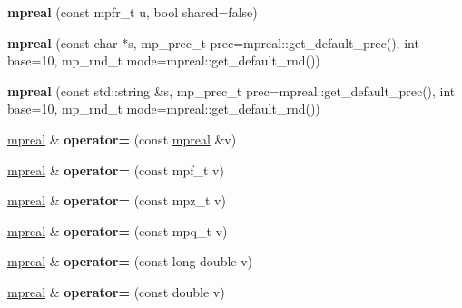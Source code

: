 \begin{DoxyCompactItemize}
{\bfseries mpreal} (const mpfr\+\_\+t u, bool shared=false)
\item 
\mbox{\label{classmpfr_1_1mpreal_ad296a1c6af9b15eda9c177a22b38af09}} 
{\bfseries mpreal} (const char $\ast$s, mp\+\_\+prec\+\_\+t prec=mpreal\+::get\+\_\+default\+\_\+prec(), int base=10, mp\+\_\+rnd\+\_\+t mode=mpreal\+::get\+\_\+default\+\_\+rnd())
\item 
\mbox{\label{classmpfr_1_1mpreal_aec2c38d5275fac999ef1dbbecbd4cf4b}} 
{\bfseries mpreal} (const std\+::string \&s, mp\+\_\+prec\+\_\+t prec=mpreal\+::get\+\_\+default\+\_\+prec(), int base=10, mp\+\_\+rnd\+\_\+t mode=mpreal\+::get\+\_\+default\+\_\+rnd())
\item 
\mbox{\label{classmpfr_1_1mpreal_a8b6d96aeb259866a554c57c95216bf3a}} 
\hyperlink{classmpfr_1_1mpreal}{mpreal} \& {\bfseries operator=} (const \hyperlink{classmpfr_1_1mpreal}{mpreal} \&v)
\item 
\mbox{\label{classmpfr_1_1mpreal_a7f00e349d3040ea4355dfe04e22623af}} 
\hyperlink{classmpfr_1_1mpreal}{mpreal} \& {\bfseries operator=} (const mpf\+\_\+t v)
\item 
\mbox{\label{classmpfr_1_1mpreal_a22c479baa5a340e77fe26f13d1807c62}} 
\hyperlink{classmpfr_1_1mpreal}{mpreal} \& {\bfseries operator=} (const mpz\+\_\+t v)
\item 
\mbox{\label{classmpfr_1_1mpreal_a5855117507a92a78df1c7d4b9fcc06ae}} 
\hyperlink{classmpfr_1_1mpreal}{mpreal} \& {\bfseries operator=} (const mpq\+\_\+t v)
\item 
\mbox{\label{classmpfr_1_1mpreal_a74b83168b2435e40823aba17e4fabf05}} 
\hyperlink{classmpfr_1_1mpreal}{mpreal} \& {\bfseries operator=} (const long double v)
\item 
\mbox{\label{classmpfr_1_1mpreal_a34550eb8a8ff3611fda73a86f88bc919}} 
\hyperlink{classmpfr_1_1mpreal}{mpreal} \& {\bfseries operator=} (const double v)
\item 
\mbox{\label{classmpfr_1_1mpreal_a2f2e09c710c69288b4a5ff76fdbd52de}} 

\end{DoxyCompactItemize}
